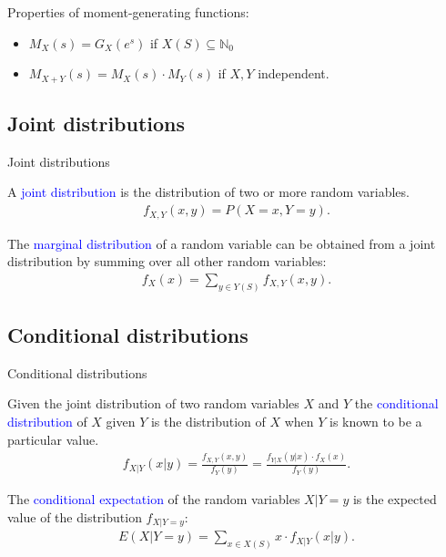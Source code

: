 \documentclass{beamer}
\def\spadding{\vspace{0.25cm}}
\def\b{\textcolor{blue}}
\begin{document}
\begin{frame}
    Properties of moment-generating functions:\pause
    \begin{itemize}
        \item $M_X(s) = G_X(e^s)$ if $X(S) \subseteq \mathbb{N}_0$ \pause
        \item $M_{X + Y}(s) = M_X(s) \cdot M_Y(s)$ if $X,Y$ independent.
    \end{itemize}
\end{frame}

\subsection{Joint distributions}
\begin{frame}{Joint distributions}
    \begin{definition}
        A \b{joint distribution} is the distribution of two or more random variables.
        \begin{align*}
            f_{X,Y}(x,y) = P(X = x, Y = y).
        \end{align*}\pause\par\spadding
        The \b{marginal distribution} of a random variable can be obtained from a joint distribution by summing over all other random variables:
        \begin{align*}
            f_X(x) = \sum_{y \in Y(S)} f_{X,Y}(x,y).
        \end{align*}
    \end{definition}
\end{frame}

\subsection{Conditional distributions}
\begin{frame}{Conditional distributions}
    \begin{definition}
        Given the joint distribution of two random variables $X$ and $Y$ the \b{conditional distribution} of $X$ given $Y$ is the distribution of $X$ when $Y$ is known to be a particular value.
        \begin{align*}
            f_{X|Y}(x|y) = \frac{f_{X,Y}(x,y)}{f_Y(y)} = \frac{f_{Y|X}(y|x) \cdot f_X(x)}{f_Y(y)}.
        \end{align*}\pause\par\spadding
        The \b{conditional expectation} of the random variables $X|Y=y$ is the expected value of the distribution $f_{X|Y=y}$:
        \begin{align*}
            E(X|Y=y) = \sum_{x \in X(S)} x \cdot f_{X|Y}(x|y).
        \end{align*}
    \end{definition}
\end{frame}
\end{document}
